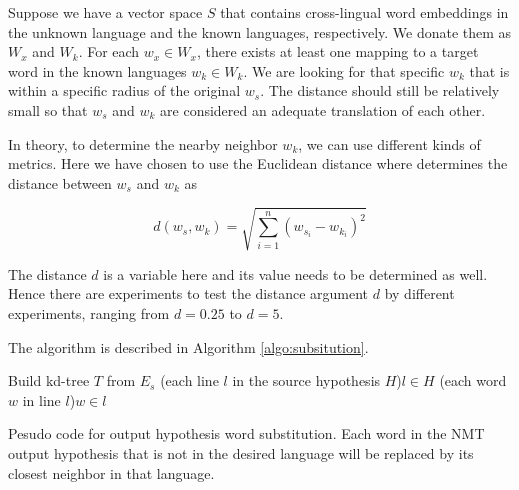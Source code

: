 \documentclass[thesis,fonts=libertine]{cluu}
\begin{document}
Suppose we have a vector space $S$ that contains cross-lingual word embeddings in the unknown language and the known languages, respectively. We donate them as $W_x$ and $W_k$. For each $w_x\in W_x$, there exists at least one mapping to a target word in the known languages $w_k \in W_k$. We are looking for that specific $w_k$ that is within a specific radius of the original $w_s$. The distance should still be relatively small so that $w_s$ and $w_k$ are considered an adequate translation of each other.

In theory, to determine the nearby neighbor $w_k$, we can use different kinds of metrics. Here we have chosen to use the Euclidean distance where determines the distance between $w_s$ and $w_k$ as

\begin{equation}
  d(w_s, w_k)=\sqrt{\sum_{i=1}^n{(w_{s_i}-w_{k_i})}^2}
\end{equation}

The distance $d$ is a variable here and its value needs to be determined as well. Hence there are experiments to test the distance argument $d$ by different experiments, ranging from $d=0.25$ to $d=5$.

The algorithm is described in Algorithm \ref{algo:subsitution}.

\begin{algorithm}[h]
  \SetAlgoLined

  Build kd-tree $T$ from $E_s$
  \For(each line $l$ in the source hypothesis $H$){$l \in H$}{
    \For(each word $w$ in line $l$){$w \in l$}{
    }
  }
  \caption{Pesudo code for output hypothesis word substitution. Each word in the NMT output hypothesis that is not in the desired language will be replaced by its closest neighbor in that language.}
  \label{algo:subsitution}
\end{algorithm}
\end{document}
